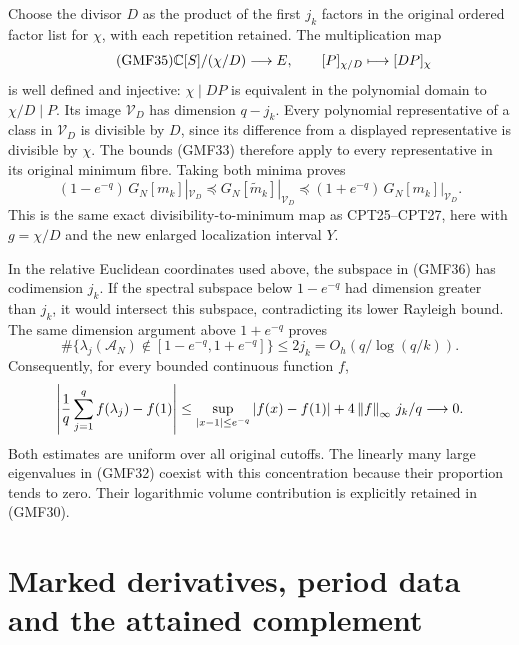 Choose the divisor \(D\) as the product of the first \(j_k\)
factors in the original ordered factor list for \(\chi\),
with each repetition retained.  The multiplication map
\begin{equation}\tag{GMF35}
 \mathbb C[S]/(\chi/D)\longrightarrow E,\qquad
 [P]_{\chi/D}\longmapsto[DP]_\chi
\end{equation}
is well defined and injective: \(\chi\mid DP\) is
equivalent in the polynomial domain to \(\chi/D\mid P\).
Its image \(\mathcal V_D\) has dimension \(q-j_k\).
Every polynomial representative of a class in \(\mathcal V_D\)
is divisible by \(D\), since its difference from a displayed
representative is divisible by \(\chi\).
The bounds (GMF33) therefore apply to every representative
in its original minimum fibre.  Taking both minima proves
\begin{equation}\tag{GMF36}
 (1-e^{-q})\,G_N[m_k]|_{\mathcal V_D}
 \preceq G_N[\widetilde m_k]|_{\mathcal V_D}
 \preceq(1+e^{-q})\,G_N[m_k]|_{\mathcal V_D}.
\end{equation}
This is the same exact divisibility-to-minimum map as
CPT25--CPT27, here with \(g=\chi/D\) and the new enlarged
localization interval \(Y\).

In the relative Euclidean coordinates used above, the
subspace in (GMF36) has codimension \(j_k\).
If the spectral subspace below \(1-e^{-q}\) had dimension
greater than \(j_k\), it would intersect this subspace,
contradicting its lower Rayleigh bound.
The same dimension argument above \(1+e^{-q}\) proves
\begin{equation}\tag{GMF37}
 \boxed{
 \#\{\lambda_j(\mathcal A_N)\notin
          [1-e^{-q},1+e^{-q}]\}
 \le2j_k=O_h(q/\log(q/k)).}
\end{equation}
Consequently, for every bounded continuous function \(f\),
\[
 \left|\frac1q\sum_{j=1}^q f(\lambda_j)-f(1)\right|
 \le\sup_{|x-1|\le e^{-q}}|f(x)-f(1)|
                    +4\left\lVert f\right\rVert_\infty\,j_k/q\longrightarrow0 .
\]
Both estimates are uniform over all original cutoffs.
The linearly many large eigenvalues in (GMF32) coexist
with this concentration because their proportion tends
to zero.  Their logarithmic volume contribution is
explicitly retained in (GMF30).

\section{Marked derivatives, period data and the attained complement}

